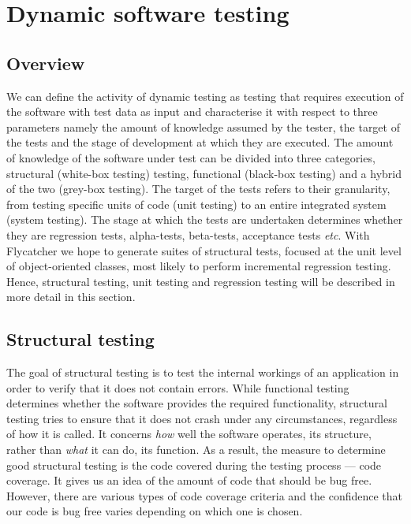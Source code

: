 \documentclass[a4paper,11pt,titlepage]{report}
\begin{document}
\section{Dynamic software testing}

\subsection{Overview}

We can define the activity of dynamic testing as testing that requires execution of the software with test data as input \cite{mahmood2007systematic} and characterise it with respect to three parameters namely the amount of knowledge assumed by the tester, the target of the tests and the stage of development at which they are executed. The amount of knowledge of the software under test can be divided into three categories, structural (white-box testing) testing, functional (black-box testing) and a hybrid of the two (grey-box testing). The target of the tests refers to their granularity, from testing specific units of code (unit testing) to an entire integrated system (system testing). The stage at which the tests are undertaken determines whether they are regression tests, alpha-tests, beta-tests, acceptance tests \emph{etc}. With Flycatcher we hope to generate suites of structural tests, focused at the unit level of object-oriented classes, most likely to perform incremental regression testing. Hence, structural testing, unit testing and regression testing will be described in more detail in this section.

\subsection{Structural testing}

The goal of structural testing is to test the internal workings \cite{mcminn2004search} of an application in order to verify that it does not contain errors. While functional testing determines whether the software provides the required functionality, structural testing tries to ensure that it does not crash under any circumstances, regardless of how it is called. It concerns \emph{how} well the software operates, its structure, rather than \emph{what} it can do, its function. As a result, the measure to determine good structural testing is the code covered during the testing process --- code coverage. It gives us an idea of the amount of code that should be bug free. However, there are various types of code coverage criteria and the confidence that our code is bug free varies depending on which one is chosen.
\end{document}
